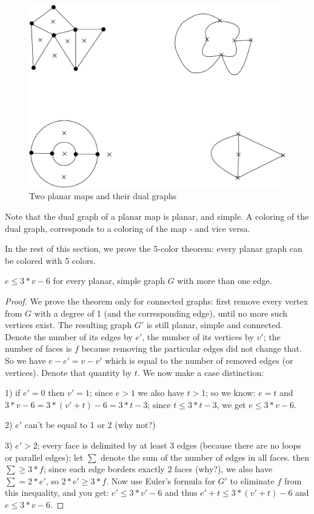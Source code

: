 \begin{figure}[ht]
\begin{center}
\includegraphics[width=0.6\linewidth,keepaspectratio]{dual1}
\end{center}
\caption{Two planar maps and their dual graphs\label{dual1}}
\end{figure}

Note that the dual graph of a planar map is planar, and simple. A
coloring of the dual graph, corresponds to a coloring of the map - and
vice versa.

In the rest of this section, we prove the 5-color theorem: every
planar graph can be colored with 5 colors.

 \begin{theorem} $e \leq 3*v-6$ for every planar, simple graph
     $G$ with more than one edge.\label{euler}
\end{theorem}
\begin{proof}
We prove the theorem only for connected graphs: first remove
every vertex from $G$ with a degree of 1 (and the corresponding edge),
until no more such vertices exist. The resulting graph $G'$ is still
planar, simple and connected. Denote the number of its edges by $e'$,
the number of its vertices by $v'$; the number of faces is $f$
because removing the particular edges did not change that. So we have
$e-e'=v-v'$ which is equal to the number of removed edges (or
vertices). Denote that quantity by $t$. We now make a case distinction:

1) if $e' = 0$ then $v' = 1$; since $e > 1$ we also have $t > 1$;
so we know: $e = t$ and $3*v-6 = 3*(v'+t) -6 = 3*t-3$; since $t \leq
3*t-3$, we get $e \leq 3*v-6$.

2) $e'$ can't be equal to 1 or 2 (why not?)

3) $e' > 2$; every face is delimited by at least 3 edges (because
there are no loops or parallel edges); let $\sum$ denote the sum of
the number of edges in all faces. then $\sum \geq 3*f$; since each
edge borders exactly 2 faces (why?), we also have $\sum = 2*e'$, so
$2*e' \geq 3*f$. Now use Euler's formula for $G'$ to eliminate $f$
from this inequality, and you get: $e' \leq 3*v'-6$ and thus $e'+t
\leq 3*(v'+t)-6$ and $e \leq 3*v-6$.
\end{proof}

